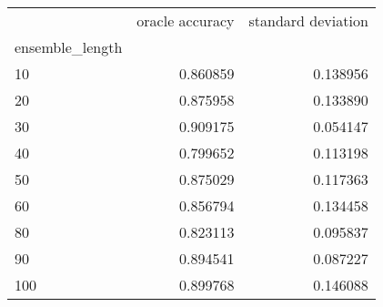 \begin{tabular}{lrr}
\toprule
{} &  oracle accuracy &  standard deviation \\
ensemble\_length &                  &                     \\
\midrule
10              &         0.860859 &            0.138956 \\
20              &         0.875958 &            0.133890 \\
30              &         0.909175 &            0.054147 \\
40              &         0.799652 &            0.113198 \\
50              &         0.875029 &            0.117363 \\
60              &         0.856794 &            0.134458 \\
80              &         0.823113 &            0.095837 \\
90              &         0.894541 &            0.087227 \\
100             &         0.899768 &            0.146088 \\
\bottomrule
\end{tabular}

